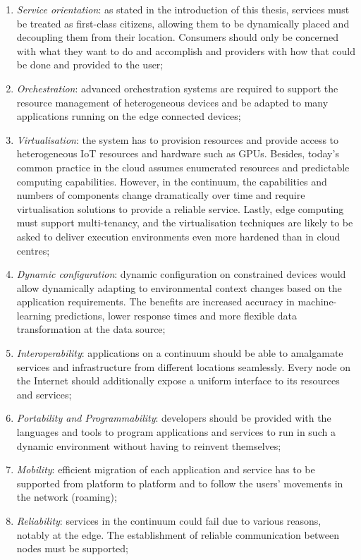 \begin{enumerate}
    \item \emph{Service orientation}: as stated in the introduction of this thesis, services must be treated as first-class citizens, allowing them to be dynamically placed and decoupling them from their location. Consumers should only be concerned with what they want to do and accomplish and providers with how that could be done and provided to the user;
    \item \emph{Orchestration}: advanced orchestration systems are required to support the resource management of heterogeneous devices and be adapted to many applications running on the edge connected devices;
    \item \emph{Virtualisation}: the system has to provision resources and provide access to heterogeneous IoT resources and hardware such as GPUs. Besides, today's common practice in the cloud assumes enumerated resources and predictable computing capabilities. However, in the continuum, the capabilities and numbers of components change dramatically over time and require virtualisation solutions to provide a reliable service. Lastly, edge computing must support multi-tenancy, and the virtualisation techniques are likely to be asked to deliver execution environments even more hardened than in cloud centres;
    \item \emph{Dynamic configuration}: dynamic configuration on constrained devices would allow dynamically adapting to environmental context changes based on the application requirements. The benefits are increased accuracy in machine-learning predictions, lower response times and more flexible data transformation at the data source;
    \item \emph{Interoperability}: applications on a continuum should be able to amalgamate services and infrastructure from different locations seamlessly. Every node on the Internet should additionally expose a uniform interface to its resources and services;
    \item \emph{Portability and Programmability}: developers should be provided with the languages and tools to program applications and services to run in such a dynamic environment without having to reinvent themselves;
    \item \emph{Mobility}: efficient migration of each application and service has to be supported from platform to platform and to follow the users' movements in the network (roaming);
    \item \emph{Reliability}: services in the continuum could fail due to various reasons, notably at the edge. The establishment of reliable communication between nodes must be supported;

\end{enumerate}
